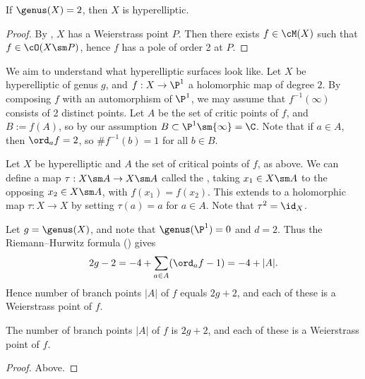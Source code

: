 \documentclass[11pt]{report}
\begin{document}
\begin{cor}
If $\genus(X)=2$, then $X$ is hyperelliptic.
\end{cor}

\begin{proof}
By , $X$ has a Weierstrass point $P$. Then there exists $f \in \cM(X)$ such that $f \in \cO(X \sm P)$, hence $f$ has a pole of order 2 at $P$.
\end{proof}

We aim to understand what hyperelliptic surfaces look like. Let $X$ be hyperelliptic of genus $g$, and $f:X \to \P^1$ a holomorphic map of degree $2$. By composing $f$ with an automorphism of $\P^1$, we may assume that $f^{-1}(\infty)$ consists of 2 distinct points. Let $A$ be the set of critic points of $f$, and $B:=f(A)$, so by our assumption $B \subset \P^1 \sm \{\infty\} =\C$. Note that if $a \in A$, then $\ord_af = 2$, so $\#f^{-1}(b)=1$ for all $b \in B$.





\begin{defn}
Let $X$ be hyperelliptic and $A$ the set of critical points of $f$, as above. We can define a map $\tau :X \sm A \to X \sm A$ called the , taking $x_1\in X \sm A$ to the opposing $x_2 \in X \sm A$, with $f(x_1)=f(x_2)$. This extends to a holomorphic map $\tau :X \to X$ by setting $\tau(a)=a$ for $a \in A$. Note that $\tau^2 = \id _X$.
\end{defn}

Let $g = \genus(X)$, and note that $\genus(\P^1)=0$ and $d=2$. Thus the Riemann--Hurwitz formula () gives
\begin{align*}
2g-2 = -4 + \sum_{a \in A}(\ord_af - 1)=-4 + |A|.
\end{align*}
Hence number of branch points $|A|$ of $f$ equals $2g+2$, and each of these is a Weierstrass point of $f$.
\begin{prop}
The number of branch points $|A|$ of $f$ is $2g+2$, and each of these is a Weierstrass point of $f$.
\end{prop}
\begin{proof}
Above.
\end{proof}
\end{document}
